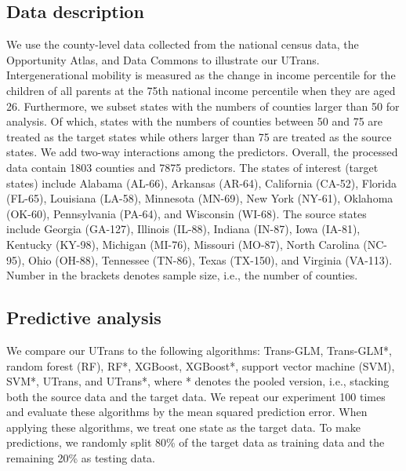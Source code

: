 \documentclass[twoside,12pt]{article}
\begin{document}
\subsection{Data description}
We use the county-level data collected from the national census data, the Opportunity Atlas, and Data Commons to illustrate our UTrans.
Intergenerational mobility is measured as the change in income percentile for the children of all parents at the 75th national income percentile when they are aged 26.
Furthermore, we subset states with the numbers of counties larger than 50 for analysis. 
Of which, states with the numbers of counties between 50 and 75 are treated as the target states while others larger than 75 are treated as the source states.
We add two-way interactions among the predictors.
Overall, the processed data contain 1803 counties and 7875 predictors.
The states of interest (target states) include Alabama (AL-66), Arkansas (AR-64), California (CA-52), Florida (FL-65), Louisiana (LA-58), Minnesota (MN-69), New York (NY-61), Oklahoma (OK-60), Pennsylvania (PA-64), and Wisconsin (WI-68).
The source states include Georgia (GA-127), Illinois (IL-88), Indiana (IN-87), Iowa (IA-81), Kentucky (KY-98), Michigan (MI-76), Missouri (MO-87), North Carolina (NC-95), Ohio (OH-88), Tennessee (TN-86), Texas (TX-150), and Virginia (VA-113).
Number in the brackets denotes sample size, i.e., the number of counties.



\subsection{Predictive analysis}

We compare our UTrans to the following algorithms: Trans-GLM, Trans-GLM*, random forest (RF), RF*, XGBoost, XGBoost*, support vector machine (SVM), SVM*, UTrans, and UTrans*, where * denotes the pooled version, i.e., stacking both the source data and the target data.
We repeat our experiment 100 times and
evaluate these algorithms by the mean squared prediction error.
When applying these algorithms, we treat one state as the target data.
To make predictions, we randomly split 80\% of the target data as training data and the remaining 20\% as testing data.
\end{document}
